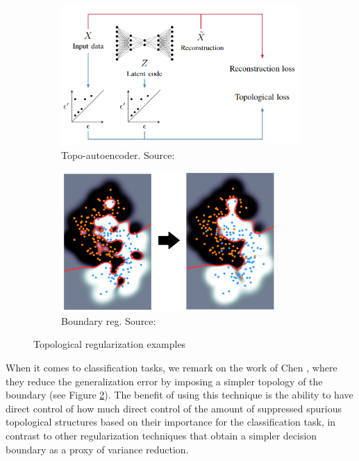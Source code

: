 \documentclass[../main.tex]{subfiles}
\begin{document}
\begin{figure}[ht!]
     \centering
    \begin{subfigure}[b]{0.45\textwidth}
         \centering
         \includegraphics[width=\textwidth]{figures/bg/topologicalAutoencoder.png}
        \caption{Topo-autoencoder. Source: \cite{moor_topological_2021}}
         \label{fig:topoAuto}
     \end{subfigure}\hfill
      \begin{subfigure}[b]{0.45\textwidth}
         \centering
         \includegraphics[width=0.9\textwidth]{figures/bg/boundaryReg.png}
        \caption{Boundary reg. Source: \cite{chen_topological_2018}}
         \label{fig:boundReg}
     \end{subfigure}
    \caption{Topological regularization examples}
    \label{fig:topoRegExtraEx}
\end{figure}


When it comes to classification tasks, we remark on the work of Chen \etal \cite{chen_topological_2018}, where they reduce the generalization error by imposing a simpler topology of the boundary (see Figure \ref{fig:boundReg}). The benefit of using this technique is the ability to have direct control of how much direct control of the amount of suppressed spurious topological structures based on their importance for the classification task, in contrast to other regularization techniques that obtain a simpler decision boundary as a proxy of variance reduction.
\end{document}
